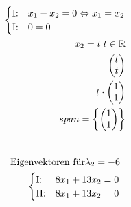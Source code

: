 \begin{align*}
    \begin{cases}
        \text{I:\@} & x_1 - x_2 = 0 \Leftrightarrow x_1 = x_2 \\
        \text{I:\@} & 0 = 0                                   \\
    \end{cases} \\
    x_2 = t | t \in \mathbb{R}                            \\
    \begin{pmatrix}
        t \\t
    \end{pmatrix}                                        \\
    t \cdot \begin{pmatrix}
                1 \\1
            \end{pmatrix}                                \\
    span = \left\{
    \begin{pmatrix}
        1 \\ 1
    \end{pmatrix}
    \right\}                                              \\\\
\end{align*}

\begin{align*}
    \text{Eigenvektoren für} \lambda_2 = -6 \\
    \begin{cases}
        \text{I:\@}  & 8x_1 + 13x_2 = 0 \\
        \text{II:\@} & 8x_1 + 13x_2 = 0
    \end{cases}         \\
\end{align*}


